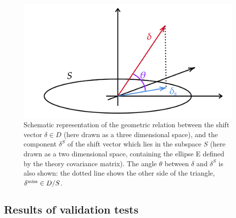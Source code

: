\begin{figure}[t]
  \begin{center}
    \includegraphics[scale=0.27]{mhous/plots/subspace_diag.png}
    \caption{\small Schematic representation of the geometric relation
      between the shift vector $\delta\in D$ (here drawn as a three dimensional space), and
      the component $\delta^S$ of the shift vector which lies in the 
subspace $S$ (here drawn as a two dimensional space, containing the ellipse E defined by the theory covariance matrix). The angle $\theta$ between $\delta$ and $\delta^S$ is also shown: the dotted line shows the other side of the triangle, $\delta^{\rm miss}\in D/S$.
    \label{fig:subspace_diagram} }
  \end{center}
\end{figure}


\subsection{Results of validation tests}
\label{sec:validresults}

